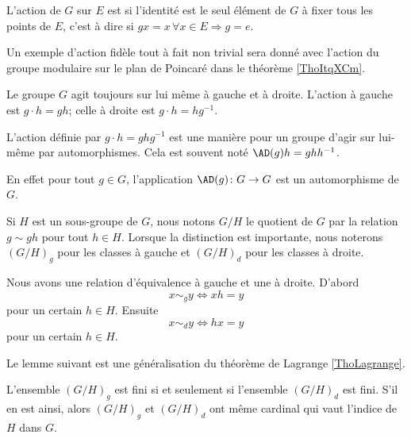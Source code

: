 \begin{definition}  \label{DefuyYJRh}
    L'action de \( G\) sur \( E\) est  si l'identité est le seul élément de \( G\) à fixer tous les points de \( E\), c'est à dire si \( gx=x\,\forall x\in E\Rightarrow g=e\).
\end{definition}

Un exemple d'action fidèle tout à fait non trivial sera donné avec l'action du groupe modulaire sur le plan de Poincaré dans le théorème \ref{ThoItqXCm}.

Le groupe \( G\) agit toujours sur lui même à gauche et à droite. L'action à gauche est \( g\cdot h=gh\); celle à droite est \( g\cdot h=hg^{-1}\). 

\begin{definition}      \label{DEFooCORTooEeOLPT}
    L'action  définie par \( g\cdot h=ghg^{-1}\) est une manière pour un groupe d'agir sur lui-même par automorphismes. Cela est souvent noté \( \AD(g)h=ghh^{-1}\).
\end{definition}
En effet pour tout \( g\in G\), l'application \( \AD(g)\colon G\to G\) est un automorphisme de \( G\).

Si \( H\) est un sous-groupe de  \( G\), nous notons \( G/H\) le quotient de $G$ par la relation \( g\sim gh\) pour tout \( h\in H\). Lorsque la distinction est importante, nous noterons \( (G/H)_g\) pour les classes à gauche et \( (G/H)_d\) pour les classes à droite.

Nous avons une relation d'équivalence à gauche et une à droite. D'abord
\begin{equation}
    x\sim_g y\Leftrightarrow xh=y
\end{equation}
pour un certain \( h\in H\). Ensuite
\begin{equation}
    x\sim_d y\Leftrightarrow hx=y
\end{equation}
pour un certain \( h\in H\). 

Le lemme suivant est une généralisation du théorème de Lagrange \ref{ThoLagrange}.

\begin{lemma}
    L'ensemble \( (G/H)_g\) est fini si et seulement si l'ensemble \( (G/H)_d\) est fini. S'il en est ainsi, alors \( (G/H)_g\) et \( (G/H)_d\) ont même cardinal qui vaut l'indice de \( H\) dans \( G\).
\end{lemma}

